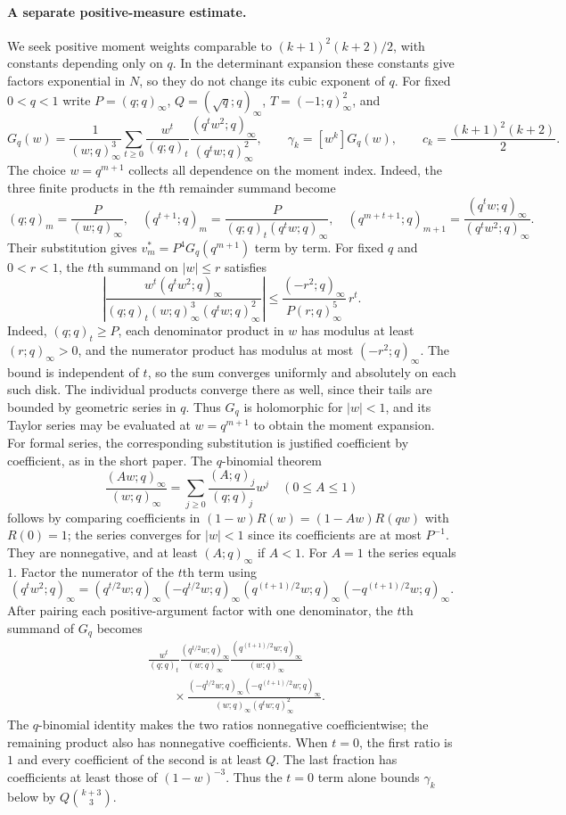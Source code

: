 \paragraph{A separate positive-measure estimate.}
We seek positive moment weights comparable to $(k+1)^2(k+2)/2$,
with constants depending only on $q$. In the determinant expansion
these constants give factors exponential in $N$, so they do not
change its cubic exponent of $q$.
For fixed $0<q<1$ write $P=(q;q)_\infty$, $Q=(\sqrt q;q)_\infty$,
$T=(-1;q)_\infty^2$, and
\[
 G_q(w)=\frac1{(w;q)_\infty^3}\sum_{t\ge0}\frac{w^t}{(q;q)_t}
          \frac{(q^tw^2;q)_\infty}{(q^tw;q)_\infty^2},
 \qquad \gamma_k=[w^k]G_q(w),\qquad c_k=\frac{(k+1)^2(k+2)}2.
\]
The choice $w=q^{m+1}$ collects all dependence on the moment index.
Indeed, the three finite products in the $t$th remainder summand become
\[
 (q;q)_m=\frac{P}{(w;q)_\infty},\quad
 (q^{t+1};q)_m=\frac{P}{(q;q)_t(q^tw;q)_\infty},\quad
 (q^{m+t+1};q)_{m+1}
 =\frac{(q^tw;q)_\infty}{(q^tw^2;q)_\infty}.
\]
Their substitution gives $v_m^*=P^4G_q(q^{m+1})$ term by term.
For fixed $q$ and $0<r<1$, the $t$th summand on $|w|\le r$ satisfies
\[
 \left|\frac{w^t(q^tw^2;q)_\infty}
 {(q;q)_t(w;q)_\infty^3(q^tw;q)_\infty^2}\right|
 \le \frac{(-r^2;q)_\infty}{P(r;q)_\infty^5}\,r^t.
\]
Indeed, $(q;q)_t\ge P$, each denominator product in $w$ has modulus
at least $(r;q)_\infty>0$, and the numerator product has modulus at
most $(-r^2;q)_\infty$. The bound is independent of $t$, so the sum
converges uniformly and absolutely on each such disk. The individual
products converge there as well, since their tails are bounded by
geometric series in $q$. Thus $G_q$ is holomorphic for $|w|<1$,
and its Taylor series may be evaluated at $w=q^{m+1}$ to obtain the
moment expansion. For formal series, the corresponding substitution is
justified coefficient by coefficient, as in the short paper.
The $q$-binomial theorem \cite[Eq.~17.2.37]{dlmf}
\[
 \frac{(Aw;q)_\infty}{(w;q)_\infty}
   =\sum_{j\ge0}\frac{(A;q)_j}{(q;q)_j}w^j\quad(0\le A\le1)
\]
follows by comparing coefficients in
$(1-w)R(w)=(1-Aw)R(qw)$ with $R(0)=1$; the series converges for $|w|<1$
since its coefficients are at most $P^{-1}$.  They are nonnegative, and
at least $(A;q)_\infty$ if $A<1$.  For $A=1$ the series equals $1$.
Factor the numerator of the $t$th term using
\[
 (q^tw^2;q)_\infty=(q^{t/2}w;q)_\infty(-q^{t/2}w;q)_\infty
 (q^{(t+1)/2}w;q)_\infty(-q^{(t+1)/2}w;q)_\infty.
\]
After pairing each positive-argument factor with one denominator,
the $t$th summand of $G_q$ becomes
\[
\begin{aligned}
 &\frac{w^t}{(q;q)_t}
  \frac{(q^{t/2}w;q)_\infty}{(w;q)_\infty}
  \frac{(q^{(t+1)/2}w;q)_\infty}{(w;q)_\infty}\\
 &\qquad{}\times
  \frac{(-q^{t/2}w;q)_\infty(-q^{(t+1)/2}w;q)_\infty}
       {(w;q)_\infty(q^tw;q)_\infty^2}.
\end{aligned}
\]
The $q$-binomial identity makes the two ratios nonnegative
coefficientwise; the remaining product also has nonnegative coefficients.
When $t=0$, the first ratio is $1$ and every coefficient of the second
is at least $Q$. The last fraction has coefficients at least those
of $(1-w)^{-3}$. Thus the $t=0$ term alone bounds $\gamma_k$ below by
$Q\binom{k+3}3$.

